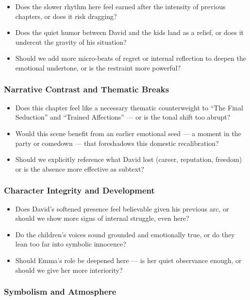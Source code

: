 \begin{itemize}
  \item Does the slower rhythm here feel earned after the intensity of previous chapters, or does it risk dragging?
  \item Does the quiet humor between David and the kids land as a relief, or does it undercut the gravity of his situation?
  \item Should we add more micro-beats of regret or internal reflection to deepen the emotional undertone, or is the restraint more powerful?
\end{itemize}

\subsubsection*{Narrative Contrast and Thematic Breaks}

\begin{itemize}
  \item Does this chapter feel like a necessary thematic counterweight to ``The Final Seduction'' and ``Trained Affections'' — or is the tonal shift too abrupt?
  \item Would this scene benefit from an earlier emotional seed — a moment in the party or comedown — that foreshadows this domestic recalibration?
  \item Should we explicitly reference what David lost (career, reputation, freedom) or is the absence more effective as subtext?
\end{itemize}

\subsubsection*{Character Integrity and Development}

\begin{itemize}
  \item Does David’s softened presence feel believable given his previous arc, or should we show more signs of internal struggle, even here?
  \item Do the children’s voices sound grounded and emotionally true, or do they lean too far into symbolic innocence?
  \item Should Emma’s role be deepened here — is her quiet observance enough, or should we give her more interiority?
\end{itemize}

\subsubsection*{Symbolism and Atmosphere}

